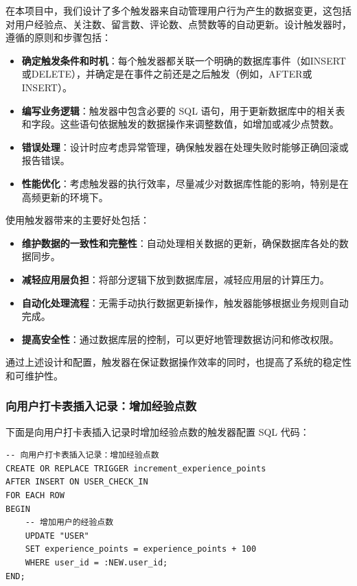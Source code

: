 在本项目中，我们设计了多个触发器来自动管理用户行为产生的数据变更，这包括对用户经验点、关注数、留言数、评论数、点赞数等的自动更新。设计触发器时，遵循的原则和步骤包括：

\begin{itemize}
    \item \textbf{确定触发条件和时机}：每个触发器都关联一个明确的数据库事件（如INSERT或DELETE），并确定是在事件之前还是之后触发（例如，AFTER或INSERT）。
    \item \textbf{编写业务逻辑}：触发器中包含必要的 SQL 语句，用于更新数据库中的相关表和字段。这些语句依据触发的数据操作来调整数值，如增加或减少点赞数。
    \item \textbf{错误处理}：设计时应考虑异常管理，确保触发器在处理失败时能够正确回滚或报告错误。
    \item \textbf{性能优化}：考虑触发器的执行效率，尽量减少对数据库性能的影响，特别是在高频更新的环境下。
\end{itemize}

使用触发器带来的主要好处包括：

\begin{itemize}
    \item \textbf{维护数据的一致性和完整性}：自动处理相关数据的更新，确保数据库各处的数据同步。
    \item \textbf{减轻应用层负担}：将部分逻辑下放到数据库层，减轻应用层的计算压力。
    \item \textbf{自动化处理流程}：无需手动执行数据更新操作，触发器能够根据业务规则自动完成。
    \item \textbf{提高安全性}：通过数据库层的控制，可以更好地管理数据访问和修改权限。
\end{itemize}

通过上述设计和配置，触发器在保证数据操作效率的同时，也提高了系统的稳定性和可维护性。

\subsubsection{向用户打卡表插入记录：增加经验点数}

下面是向用户打卡表插入记录时增加经验点数的触发器配置 SQL 代码：

\begin{verbatim}
-- 向用户打卡表插入记录：增加经验点数
CREATE OR REPLACE TRIGGER increment_experience_points
AFTER INSERT ON USER_CHECK_IN
FOR EACH ROW
BEGIN
    -- 增加用户的经验点数
    UPDATE "USER"
    SET experience_points = experience_points + 100
    WHERE user_id = :NEW.user_id;
END;
\end{verbatim}

